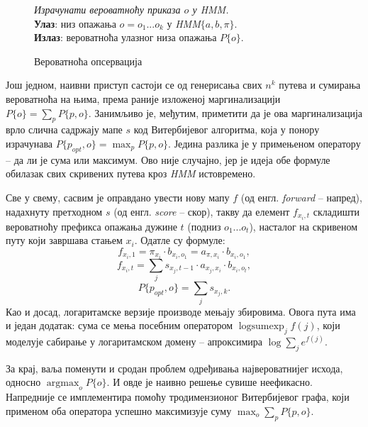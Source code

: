 \documentclass[12pt,oneside]{memoir}
\newenvironment{problem}[1][!ht]
{\renewcommand{\algorithmcfname}{Проблем}
\begin{figure}[!ht]
\centering
  \begin{minipage}{.94\linewidth}
	\begin{algorithm}[#1]%
  }{\end{algorithm}
  \end{minipage}
\end{figure}}
\begin{document}
\begin{CJK}{UTF8}{ipxm}
\begin{problem}[H]
  \SetAlgoLined
  \textit{Израчунати вероватноћу приказа $o$ у \textit{HMM}.}\\
  \textbf{Улаз}: низ опажања $o = o_1...o_k$ у \textit{HMM}$\{a, b, \pi\}$.\\
  \textbf{Излаз}: вероватноћа улазног низа опажања $P\{o\}$.
  \caption{Вероватноћа опсервација\cite{ba10d}}
  \label{prob:ops}
\end{problem}

Још једном, наивни приступ састоји се од генерисања свих $n^k$ путева и сумирања вероватноћа на њима, према раније изложеној маргинализацији $P\{o\} = \sum_p P\{p, o\}$. Занимљиво је, међутим, приметити да је ова маргинализација врло слична садржају мапе $s$ код Витербијевог алгоритма, која у понору израчунава $P\{p_{opt}, o\} = \max_p P\{p, o\}$. Једина разлика је у примењеном оператору -- да ли је сума или максимум. Ово није случајно, јер је идеја обе формуле обилазак свих скривених путева кроз \textit{HMM} истовремено.

Све у свему, сасвим је оправдано увести нову мапу $f$ (од енгл. \textit{forward} -- напред), надахнуту претходном $s$ (од енгл. \textit{score} -- скор), такву да елемент $f_{x_i, t}$ складишти вероватноћу префикса опажања дужине $t$ (подниз $o_1...o_t$), насталог на скривеном путу који завршава стањем $x_i$. Одатле су формуле: $$f_{x_i, 1} = \pi_{x_i} \cdot b_{x_i, o_1} = a_{\pi, x_i} \cdot b_{x_i, o_1},$$ $$f_{x_i, t} = \sum_j s_{x_j, t-1} \cdot a_{x_j, x_i} \cdot b_{x_i, o_t},$$ $$P\{p_{opt}, o\} = \sum_j s_{x_j, k}.$$ Као и досад, логаритамске верзије производе мењају збировима. Овога пута има и један додатак: сума се мења посебним оператором $\operatorname{logsumexp}_j f(j)$, који моделује сабирање у логаритамском домену -- апроксимира $\log \sum_j e^{f(j)}$.

За крај, ваља поменути и сродан проблем одређивања највероватнијег исхода, односно $\operatorname{argmax}_o P\{o\}$. И овде је наивно решење сувише неефикасно. Напредније се имплементира помоћу тродимензионог Витербијевог графа, који применом оба оператора успешно максимизује суму $\max_o \sum_p P\{p, o\}$.


\end{CJK}
\end{document}

